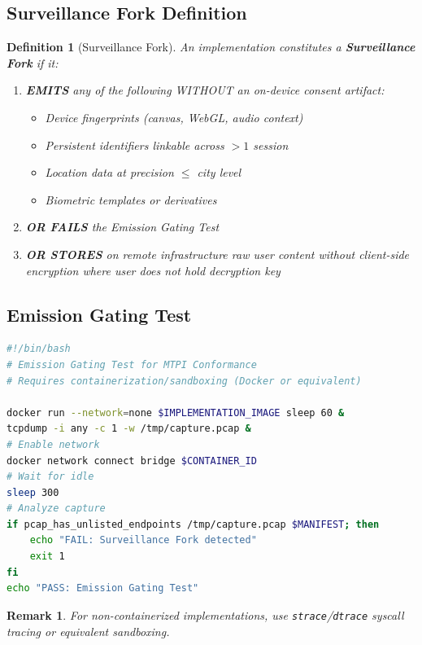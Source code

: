 \documentclass[11pt,a4paper]{article}
\newtheorem{definition}[theorem]{Definition}
\newtheorem{remark}[theorem]{Remark}
\begin{document}
\subsection{Surveillance Fork Definition}

\begin{definition}[Surveillance Fork]
An implementation constitutes a \textbf{Surveillance Fork} if it:
\begin{enumerate}[noitemsep]
    \item \textbf{EMITS} any of the following WITHOUT an on-device consent artifact:
    \begin{itemize}[noitemsep]
        \item Device fingerprints (canvas, WebGL, audio context)
        \item Persistent identifiers linkable across $>1$ session
        \item Location data at precision $\leq$ city level
        \item Biometric templates or derivatives
    \end{itemize}
    \item \textbf{OR FAILS} the Emission Gating Test
    \item \textbf{OR STORES} on remote infrastructure raw user content without client-side encryption where user does not hold decryption key
\end{enumerate}
\end{definition}

\subsection{Emission Gating Test}

\begin{lstlisting}[language=bash,caption={Emission Gating Test}]
#!/bin/bash
# Emission Gating Test for MTPI Conformance
# Requires containerization/sandboxing (Docker or equivalent)

docker run --network=none $IMPLEMENTATION_IMAGE sleep 60 &
tcpdump -i any -c 1 -w /tmp/capture.pcap &
# Enable network
docker network connect bridge $CONTAINER_ID
# Wait for idle
sleep 300
# Analyze capture
if pcap_has_unlisted_endpoints /tmp/capture.pcap $MANIFEST; then
    echo "FAIL: Surveillance Fork detected"
    exit 1
fi
echo "PASS: Emission Gating Test"
\end{lstlisting}

\begin{remark}
For non-containerized implementations, use \texttt{strace}/\texttt{dtrace} syscall tracing or equivalent sandboxing.
\end{remark}
\end{document}
